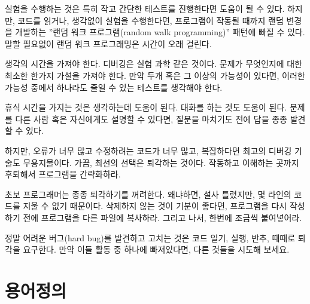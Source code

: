 실험을 수행하는 것은 특히 작고 간단한 테스트를 진행한다면 도움이 될 수 있다.
하지만, 코드를 읽거나, 생각없이 실험을 수행한다면, 프로그램이 작동될 때까지 랜덤 변경을 개발하는 ''랜덤 워크 프로그램(random walk programming)''
패턴에 빠질 수 있다. 말할 필요없이 랜덤 워크 프로그래밍은 시간이 오래 걸린다.


생각의 시간을 가져야 한다. 디버깅은 실험 과학 같은 것이다. 문제가 무엇인지에 대한 최소한 한가지 가설을 가져야 한다.
만약 두개 혹은 그 이상의 가능성이 있다면, 이러한 가능성 중에서 하나라도 줄일 수 있는 테스트를 생각해야 한다.

휴식 시간을 가지는 것은 생각하는데 도움이 된다. 대화를 하는 것도 도움이 된다.
문제를 다른 사람 혹은 자신에게도 설명할 수 있다면, 질문을 마치기도 전에 답을 종종 발견할 수 있다.

하지만, 오류가 너무 많고 수정하려는 코드가 너무 많고, 복잡하다면 최고의 디버깅 기술도 무용지물이다.
가끔, 최선의 선택은 퇴각하는 것이다. 작동하고 이해하는 곳까지 후퇴해서 프로그램을 간략화하라.

초보 프로그래머는 종종 퇴각하기를 꺼려한다. 왜냐하면, 설사 틀렸지만, 몇 라인의 코드를 지울 수 없기 때문이다.
삭제하지 않는 것이 기분이 좋다면, 프로그램을 다시 작성하기 전에 프로그램을 다른 파일에 복사하라.
그리고 나서, 한번에 조금씩 붙여넣어라. 

정말 어려운 버그(hard bug)를 발견하고 고치는 것은 코드 일기, 실행, 반추, 때때로 퇴각을 요구한다.
만약 이들 활동 중 하나에 빠져있다면, 다른 것들을 시도해 보세요.

\section{용어정의}

